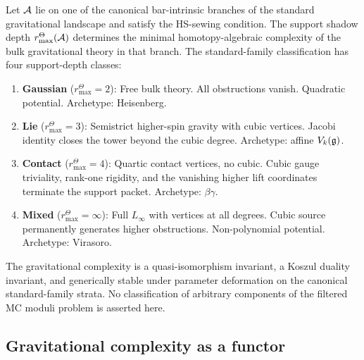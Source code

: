 \begin{maintheorem}
\ClaimStatusProvedHere
{}
Let $\mathcal{A}$ lie on one of the canonical bar-intrinsic branches of the
standard gravitational landscape and satisfy the HS-sewing condition.
The support shadow depth \(r^\Theta_{\max}(\mathcal{A})\) determines the
minimal homotopy-algebraic complexity of the bulk gravitational
theory in that branch.  The standard-family classification has four
support-depth classes:
\begin{enumerate}[label=\textup{(\roman*)}]
\item \textbf{Gaussian} (\(r^\Theta_{\max}=2\)):
 Free bulk theory. All obstructions vanish.
 Quadratic potential. Archetype: Heisenberg.

\item \textbf{Lie} (\(r^\Theta_{\max}=3\)):
 Semistrict higher-spin gravity with cubic vertices.
 Jacobi identity closes the tower beyond the cubic degree.
 Archetype: affine $V_k(\mathfrak{g})$.

\item \textbf{Contact} (\(r^\Theta_{\max}=4\)):
 Quartic contact vertices, no cubic.
 Cubic gauge triviality, rank-one rigidity, and the vanishing
 higher lift coordinates terminate the support packet.
 Archetype: $\beta\gamma$.

\item \textbf{Mixed} (\(r^\Theta_{\max}=\infty\)):
 Full $L_\infty$ with vertices at all degrees.
 Cubic source permanently generates higher obstructions.
 Non-polynomial potential. Archetype: Virasoro.
\end{enumerate}
The gravitational complexity is a quasi-isomorphism invariant,
a Koszul duality invariant, and generically stable under
parameter deformation on the canonical standard-family strata.  No
classification of arbitrary components of the filtered MC moduli
problem is asserted here.
\end{maintheorem}



\subsection{Gravitational complexity as a functor}


